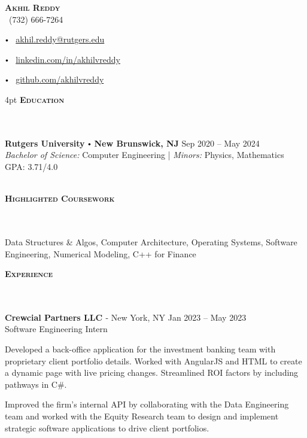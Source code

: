\documentclass{article}
\newcommand{\contact}[3]{
\vspace*{3pt}
\begin{center}
{\LARGE \scshape {#1}}\\
\vspace{5pt}
#2 
\vspace{2pt}
#3
\end{center}
\vspace*{-8pt}
}
\newcommand{\header}[1]{{
\hspace*{0pt}\vspace*{6pt} \textsc{#1}} \vspace*{-6pt} 
\lineunder
}
\newcommand{\lineunder}{
\vspace*{-8pt} \\ \hspace*{-3pt} 
\hrulefill \\
}
\newcommand{\college}[7]{
\textbf{#1} \labelitemi \textbf{#2} \hfill #3 \\ #4 \hfill #7 \\ #5 \\ #6 \vspace*{5pt}
}
\newcommand{\employer}[4]{{
\vspace*{2pt}%
\textbf{#1} #2 \hfill #3\\ #4 \vspace*{2pt}}
}
\renewcommand{\labelitemi}{
$\vcenter{\hbox{\tiny$\bullet$}}$\hspace*{3pt}
}
\renewcommand{\labelitemii}{
$\vcenter{\hbox{\tiny$\bullet$}}$\hspace*{-3pt}
}
\newenvironment{bullet-list-major}{
\begin{list}{\labelitemii}{\setlength\leftmargin{9pt} 
\topsep 0pt \itemsep -2pt}}{\vspace*{4pt}\end{list}
}
\newenvironment{bullet-list-minor}{
\begin{list}{\labelitemii}{\setlength\leftmargin{15pt} 
\topsep 0pt \itemsep -2pt}}{\vspace*{4pt}\end{list}
}
\begin{document}
\small
\smallskip
\vspace*{-44pt}

\contact{\textbf{Akhil Reddy}}
{\faPhone\ (732) 666-7264
\labelitemi \faEnvelope\ \href{mailto:avr54@scarletmail.rutgers.edu}{akhil.reddy@rutgers.edu}
\labelitemi \faLinkedin\ \href{https://www.linkedin.com/in/akhilvreddy/}{linkedin.com/in/akhilvreddy}
\labelitemi \faGithub\ \href{https://github.com/akhilvreddy}{github.com/akhilvreddy}%

}

\vspace{4pt}
\header{\textbf{Education}}
    \college{Rutgers University}{New Brunswick, NJ}{Sep 2020 -- May 2024}
    {\textit{Bachelor of Science:}  Computer Engineering | \textit{Minors:} Physics, Mathematics}
    {}{} {GPA: 3.71/4.0}

    
\vspace*{4pt}%
\header{\textbf{Highlighted Coursework}}
    Data Structures \& Algos, Computer Architecture, Operating Systems, Software Engineering, Numerical Modeling, C++ for Finance
    
\vspace*{4pt}%
\header{\textbf{Experience}}
    \employer{Crewcial Partners LLC \textsuperscript{\textcopyright}}
    {- New York, NY}{Jan 2023 -- May 2023}{Software Engineering Intern}
    \begin{bullet-list-minor}
	\item Developed a back-office application for the investment banking team with proprietary client portfolio details. Worked with AngularJS and HTML to create a dynamic page with live pricing changes. Streamlined ROI factors by including pathways in C\#. 
	\item Improved the firm's internal API by collaborating with the Data Engineering team and worked with the Equity Research team to design and implement strategic software applications to drive client portfolios.
    \end{bullet-list-minor}
\end{document}
